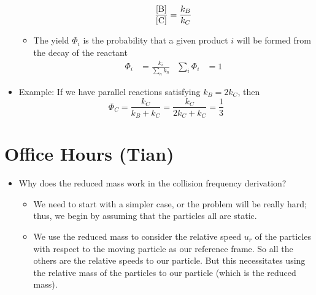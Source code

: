\documentclass[../notes.tex]{subfiles}
\begin{document}
\begin{itemize}
\begin{itemize}
        \begin{equation*}
            \frac{[\ce{B}]}{[\ce{C}]} = \frac{k_B}{k_C}
        \end{equation*}
        \item The yield $\Phi_i$ is the probability that a given product $i$ will be formed from the decay of the reactant
        \begin{align*}
            \Phi_i &= \frac{k_i}{\sum_nk_n}&
            \sum_i\Phi_i &= 1
        \end{align*}
    \end{itemize}
    \item Example: If we have parallel reactions satisfying $k_B=2k_C$, then
    \begin{equation*}
        \Phi_C = \frac{k_C}{k_B+k_C}
        = \frac{k_C}{2k_C+k_C}
        = \frac{1}{3}
    \end{equation*}
\end{itemize}



\section{Office Hours (Tian)}
\begin{itemize}
    \item Why does the reduced mass work in the collision frequency derivation?
    \begin{itemize}
        \item We need to start with a simpler case, or the problem will be really hard; thus, we begin by assuming that the particles all are static.
        \item We use the reduced mass to consider the relative speed $u_r$ of the particles with respect to the moving particle as our reference frame. So all the others are the relative speeds to our particle. But this necessitates using the relative mass of the particles to our particle (which is the reduced mass).
    \end{itemize}
\end{itemize}
\end{document}
